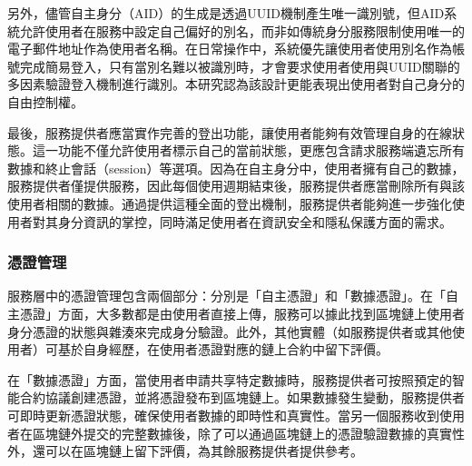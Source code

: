 另外，儘管自主身分（AID）的生成是透過UUID機制\cite{uuid}產生唯一識別號，但AID系統允許使用者在服務中設定自己偏好的別名，而非如傳統身分服務限制使用唯一的電子郵件地址作為使用者名稱。在日常操作中，系統優先讓使用者使用別名作為帳號完成簡易登入，只有當別名難以被識別時，才會要求使用者使用與UUID關聯的多因素驗證登入機制進行識別。本研究認為該設計更能表現出使用者對自己身分的自由控制權。

最後，服務提供者應當實作完善的登出功能，讓使用者能夠有效管理自身的在線狀態。這一功能不僅允許使用者標示自己的當前狀態，更應包含請求服務端遺忘所有數據和終止會話（session）等選項。因為在自主身分中，使用者擁有自己的數據，服務提供者僅提供服務，因此每個使用週期結束後，服務提供者應當刪除所有與該使用者相關的數據。通過提供這種全面的登出機制，服務提供者能夠進一步強化使用者對其身分資訊的掌控，同時滿足使用者在資訊安全和隱私保護方面的需求。
\subsubsection{憑證管理}
服務層中的憑證管理包含兩個部分：分別是「自主憑證」和「數據憑證」。在「自主憑證」方面，大多數都是由使用者直接上傳，服務可以據此找到區塊鏈上使用者身分憑證的狀態與雜湊來完成身分驗證。此外，其他實體（如服務提供者或其他使用者）可基於自身經歷，在使用者憑證對應的鏈上合約中留下評價。

在「數據憑證」方面，當使用者申請共享特定數據時，服務提供者可按照預定的智能合約協議創建憑證，並將憑證發布到區塊鏈上。如果數據發生變動，服務提供者可即時更新憑證狀態，確保使用者數據的即時性和真實性。當另一個服務收到使用者在區塊鏈外提交的完整數據後，除了可以通過區塊鏈上的憑證驗證數據的真實性外，還可以在區塊鏈上留下評價，為其餘服務提供者提供參考。
